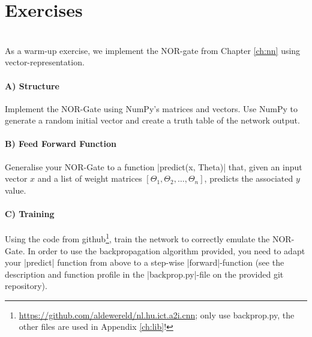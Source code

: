 \section{Exercises}
\begin{exercise}\mbox{}\\
  As a warm-up exercise, we implement the NOR-gate from Chapter \ref{ch:nn} using vector-representation.
  \paragraph{A) Structure}
  Implement the NOR-Gate using NumPy's matrices and vectors. Use NumPy to generate a random initial vector and create a truth table of the network output.
  \paragraph{B) Feed Forward Function}
  Generalise your NOR-Gate to a function \py|predict(x, Theta)| that, given an input vector $x$ and a list of weight matrices $[\Theta_1, \Theta_2, \dots, \Theta_n]$, predicts the associated $y$ value.
  \paragraph{C) Training}
  Using the code from github\footnote{\url{https://github.com/aldewereld/nl.hu.ict.a2i.cnn}; only use backprop.py, the other files are used in Appendix \ref{ch:lib}!}, train the network to correctly emulate the NOR-Gate. In order to use the backpropagation algorithm provided, you need to adapt your \py|predict| function from above to a step-wise \py|forward|-function (see the description and function profile in the \py|backprop.py|-file on the provided git repository).
\end{exercise}
